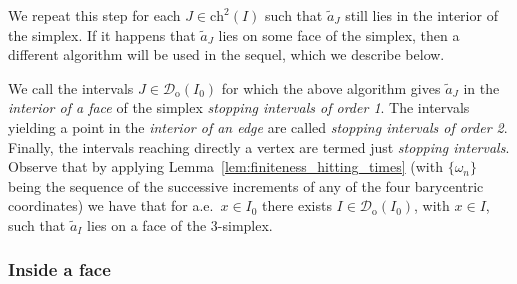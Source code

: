 \documentclass{amsart}
\newcommand{\cD}{\mathcal{D}}
\newcommand{\wt}{\widetilde}
\theoremstyle{definition}
\theoremstyle{remark}
\begin{document}
We repeat this step for each $J\in\mathrm{ch}^2(I)$ such that $\wt{a}_{J}$ still lies in the interior of the simplex. If it happens that $\wt{a}_{J}$ lies on some face of the simplex, then a different algorithm will be used in the sequel, which we describe below.

We call the intervals $J\in\cD_{\mathrm{o}}(I_0)$ for which the above algorithm gives $\wt{a}_J$ in the \emph{interior of a face} of the simplex \emph{stopping intervals of order 1}. The intervals yielding a point in the \emph{interior of an edge} are called \emph{stopping intervals of order 2}. Finally, the intervals reaching directly a vertex are termed just \emph{stopping intervals}. Observe that by applying Lemma~\ref{lem:finiteness_hitting_times} (with $\{\omega_n\}$ being the sequence of the successive increments of any of the four barycentric coordinates) we have that for a.e.~$x\in I_0$ there exists $I\in\cD_{\mathrm{o}}(I_0)$, with $x\in I$, such that $\wt{a}_{I}$ lies on a face of the $3$-simplex.

\subsubsection{Inside a face}
\end{document}
